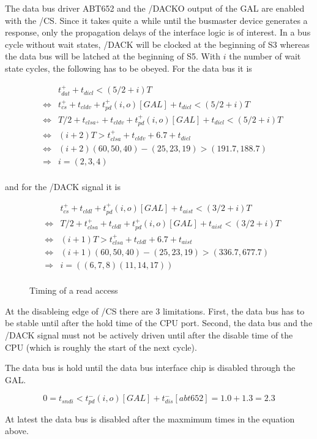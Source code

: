 \documentclass[12pt]{article}
\newcommand{\myfig}[4]{%
  \begin{figure}[htbp] \begin{center}%
  \makebox{\epsfysize=#2 \epsfbox{#1}} \caption{\label{#3} #4}%
  \end{center} \end{figure}}
\newcommand{\beqn}{\begin{eqnarray*}}
\newcommand{\eeqn}{\end{eqnarray*}}
\begin{document}
The data bus driver ABT652 and the /DACKO output of the GAL are
enabled with the /CS. Since it takes quite a while until the busmaster
device generates a response, only the propagation delays of the
interface logic is of interest. In a bus cycle without wait states,
/DACK will be clocked at the beginning of S3 whereas the data bus will
be latched at the beginning of S5. With $i$ the number of wait state
cycles, the following has to be obeyed. For the data bus it is

\beqn
& & t_{dat}^+ + t_{dicl} < (5/2 + i) T\\
&\Leftrightarrow& t_{cs}^+ + t_{cldv} + t_{pd}^+(i,o)[GAL] +
t_{dicl} < (5/2 + i) T\\
&\Leftrightarrow& T/2 + t_{clsa^+} + t_{cldv} + t_{pd}^+(i,o)[GAL] +
t_{dicl} < (5/2 + i) T\\
&\Leftrightarrow& (i+2) T > t_{clsa}^+ + t_{cldv} + 6.7 + t_{dicl}\\
&\Leftrightarrow& (i+2)(60,50,40) - (25,23,19) > (191.7,188.7)\\
&\Rightarrow& i = (2,3,4)\\
\eeqn

and for the /DACK signal it is

\beqn
& & t_{cs}^+ + t_{cldl} + t_{pd}^+(i,o)[GAL] +
t_{aist} < (3/2 + i) T\\
&\Leftrightarrow& T/2 + t_{clsa}^+ + t_{cldl} + t_{pd}^+(i,o)[GAL] +
t_{aist} < (3/2 + i) T\\
&\Leftrightarrow& (i+1) T > t_{clsa}^+ + t_{cldl} +  6.7 + t_{aist}\\
&\Leftrightarrow& (i+1)(60,50,40) - (25,23,19) > (336.7,677.7)\\
&\Rightarrow& i = ((6,7,8)(11,14,17))\\
\eeqn

\myfig{rd-dev-tim.eps}{100mm}{rd-dev-tim}{Timing of a read access}

At the disableing edge of /CS there are 3 limitations. First, the data
bus has to be stable until after the hold time of the CPU
port. Second, the data bus and the /DACK signal must not be actively
driven until after the disable time of the CPU (which is roughly the
start of the next cycle).

The data bus is hold until the data bus interface chip is disabled
through the GAL.

\[ 0 = t_{sndi} < t_{pd}^-(i,o)[GAL] + t_{dis}^-[abt652] = 1.0 + 1.3 = 2.3
\]

At latest the data bus is disabled after the maxmimum times in the
equation above.
\end{document}
